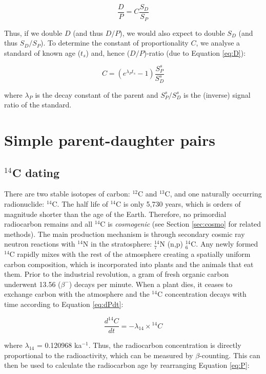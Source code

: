\documentclass{book}
\begin{document}
\begin{equation}
\frac{D}{P} = C \frac{S_D}{S_P}
\label{eq:eqC}
\end{equation}

Thus, if we double $D$ (and thus $D/P$), we would also expect to
double $S_D$ (and thus $S_D/S_P$). To determine the constant of
proportionality $C$, we analyse a standard of known age ($t_s$) and,
hence ($D/P$)-ratio (due to Equation \ref{eq:D}):

\begin{equation}
C = \left(e^{\lambda_Pt_s} - 1\right) \frac{S^s_P}{S^s_D}
\label{eq:const}
\end{equation}

where $\lambda_P$ is the decay constant of the parent and
$S^s_P/S^s_D$ is the (inverse) signal ratio of the standard.

\chapter{Simple parent-daughter pairs}

\section{$^{14}$C dating}
\label{sec:14C}

There are two stable isotopes of carbon: $^{12}$C and $^{13}$C, and
one naturally occurring radionuclide: $^{14}$C. The half life of
$^{14}$C is only 5,730 years, which is orders of magnitude shorter
than the age of the Earth. Therefore, no primordial radiocarbon
remains and all $^{14}$C is \emph{cosmogenic} (see Section
\ref{sec:cosmo} for related methods).  The main production mechanism
is through secondary cosmic ray neutron reactions with $^{14}$N in the
stratosphere: $^{14}_7$N (n,p) $^{14}_6$C. Any newly formed $^{14}$C
rapidly mixes with the rest of the atmosphere creating a spatially
uniform carbon composition, which is incorporated into plants and the
animals that eat them. Prior to the industrial revolution, a gram of
fresh organic carbon underwent 13.56 ($\beta^-$) decays per
minute. When a plant dies, it ceases to exchange carbon with the
atmosphere and the $^{14}$C concentration decays with time according
to Equation \ref{eq:dPdt}:

\begin{equation}
\frac{d^{14}C}{dt} = -\lambda_{14} \times {}^{14}C
\label{eq:d14Cdt}
\end{equation}

where $\lambda_{14}$ = 0.120968 ka$^{-1}$. Thus, the radiocarbon
concentration is directly proportional to the radioactivity, which can
be measured by $\beta$-counting. This can then be used to calculate
the radiocarbon age by rearranging Equation \ref{eq:P}:
\end{document}
